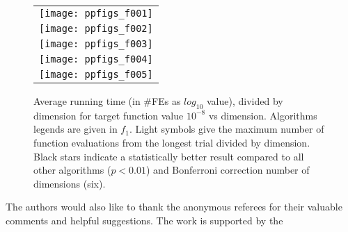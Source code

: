     \begin{figure}[h!tb]
        \begin{tabular}
            {c@{\hspace*{-0.00001\textwidth}}
            }
           
        \texttt{[image: ppfigs\_f001]}\\
        \texttt{[image: ppfigs\_f002]}\\

        \texttt{[image: ppfigs\_f003]}\\
        \texttt{[image: ppfigs\_f004]}\\
        
        \texttt{[image: ppfigs\_f005]}\\
        \end{tabular}
        \vspace{-3ex}
         \caption{Average running time (in \#FEs as $log_{10}$ value),
          divided by dimension for target function value $10^{-8}$ vs dimension. 
          Algorithms legends are given in $f_1$. Light symbols give the maximum number of 
          function evaluations from the longest trial divided by dimension. 
          Black stars indicate a statistically better result compared to 
          all other algorithms ($p < 0.01$) and Bonferroni 
          correction number of dimensions (six).}
    \end{figure}  


\begin{acks}

  The authors would also like to thank the anonymous referees for
  their valuable comments and helpful suggestions. The work is
  supported by the 
\end{acks}
